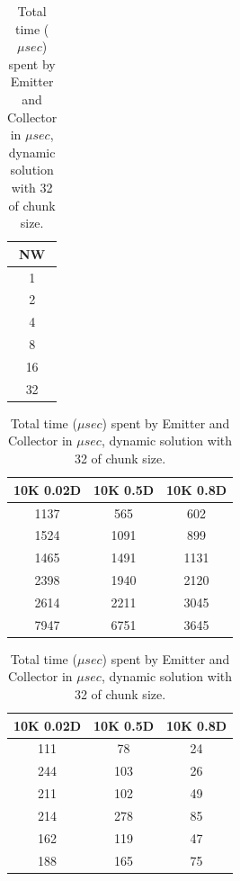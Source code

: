 \begin{table}[!htb]
\centering
\begin{minipage}{0.08\textwidth}
\centering
\begin{tabular}{|c|}
\hline
NW \\ \hline
1          \\ \hline
2      \\ \hline
4           \\ \hline
8            \\ \hline
16       \\ \hline
32          \\ \hline
\end{tabular}
\end{minipage}
\begin{minipage}{0.43\textwidth}
\centering
\begin{tabular}{|c|c|c|}
\hline
10K 0.02D & 10K 0.5D & 10K 0.8D \\ \hline
1137       & 565      & 602      \\ \hline
1524       & 1091     & 899      \\ \hline
1465       & 1491     & 1131     \\ \hline
2398      & 1940      & 2120     \\ \hline
2614      & 2211     & 3045     \\ \hline
7947      & 6751     & 3645     \\ \hline
\end{tabular}
\end{minipage}
\begin{minipage}{0.43\textwidth}
\centering
\begin{tabular}{|c|c|c|}
\hline
10K 0.02D & 10K 0.5D & 10K 0.8D \\ \hline
111       & 78       & 24       \\ \hline
244       & 103      & 26       \\ \hline
211       & 102      & 49       \\ \hline
214       & 278      & 85       \\ \hline
162       & 119      & 47       \\ \hline
188       & 165      & 75       \\ \hline
\end{tabular}
\end{minipage}
\caption{Total time ($\mu sec$) spent by Emitter and Collector in $\mu sec$, dynamic solution with 32 of chunk size.}
\label{table:emit_coll_dy}
\end{table}
\FloatBarrier

